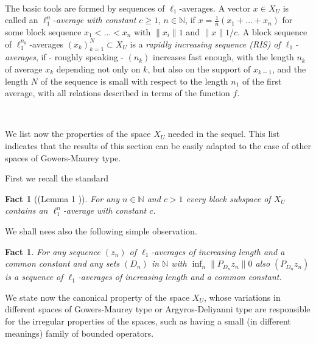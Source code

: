 \documentclass{amsart}
\newtheorem{fact}[theorem]{Fact}
\numberwithin{subsection}{section}
\numberwithin{equation}{section}
\begin{document}
\

The basic tools are formed by sequences of $\ell_1$-averages. A vector $x\in X_U$ is called an $\ell_{1}^{n}$-\textit{average with constant} $c\geq 1$, $n\in{{\mathbb{N}}}$, if  $x=\frac{1}{n}(x_{1}+\dots+x_{n})$ for some block sequence $x_1<\dots<x_n$ with ${\lVert x_{i}\rVert}  1$ and  ${\lVert x\rVert} 1/c$. A block sequence of 
$\ell_1^{n_k}$-averages $(x_k)_{k=1}^N\subset X_U$ is a \textit{rapidly increasing sequence (RIS) of $\ell_1$-averages}, if - roughly speaking - $(n_k)$ increases fast enough, with the length $n_k$ of average $x_k$ depending not only on $k$, but also on the support of $x_{k-1}$, and the length $N$ of the sequence is small with respect to the length $n_1$ of the first average, with all relations described in terms of the function $f$. 

\

We list now the properties of the space $X_U$ needed in the sequel. This list indicates that the results of this section can be easily adapted to the case of other spaces of Gowers-Maurey type. 

First we recall the standard
\begin{fact}[(Lemma 1 \cite{G})]\label{fact4}
For any $n\in{{\mathbb{N}}}$ and $c>1$ every block subspace of $X_U$ contains an $\ell_1^n$-average with constant $c$.
\end{fact}
We shall nees also the following simple observation.
\begin{fact}\label{fact5}
 For any sequence $(z_n)$ of $\ell_1$-averages of increasing length and a common constant and any sets $(D_n)$ in ${{\mathbb{N}}}$ with $\inf_n{\lVert P_{D_n}z_n\rVert}0$ also $(P_{D_n}z_n)$ is a sequence of $\ell_1$-averages of increasing length and a common constant. 
\end{fact}

We state now the canonical property of the space $X_U$, whose variations in different spaces of Gowers-Maurey type or Argyros-Deliyanni type are responsible for the irregular properties of the spaces, such as having a small (in different meanings) family of bounded operators. 
\end{document}
